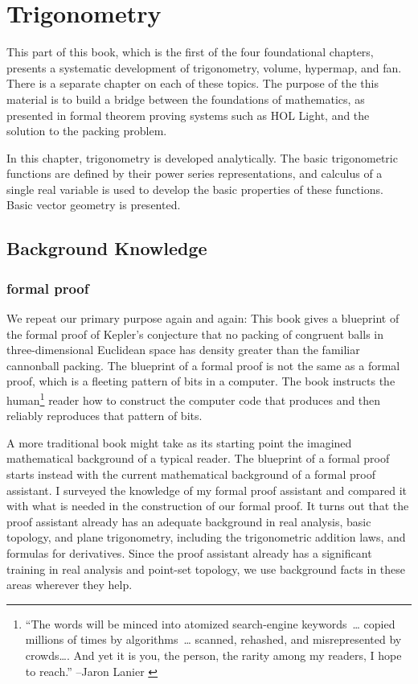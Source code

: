 \chapter{Trigonometry}
\label{part:trig}
%

\begin{summary}
  This part of this book, which is the first of the four foundational
  chapters, presents a systematic development of trigonometry, volume,
  hypermap, and fan.  There is a separate chapter on each of these
  topics.  The purpose of the this material is to build a bridge
  between the foundations of mathematics, as presented in formal
  theorem proving systems such as HOL Light, and the solution to the
  packing problem.  

  In this chapter, trigonometry is developed analytically.  The basic
  trigonometric functions are defined by their power series
  representations, and calculus of a single real variable is used to
  develop the basic properties of these functions.  Basic vector
  geometry is presented.
\end{summary}


\section{Background Knowledge}

\subsection{formal proof}

We repeat our primary purpose again and again: This book gives a
blueprint of the formal proof of Kepler's conjecture that no packing of
congruent balls in three-dimensional Euclidean space has density
greater than the familiar cannonball packing.  The blueprint of a
formal proof is not the same as a formal proof, which is a 
fleeting pattern of bits in a computer.  The book instructs the
human\footnote{``The words will be minced into atomized search-engine
  keywords~\dots{} copied millions of times by algorithms~\dots{}
  scanned, rehashed, and misrepresented by crowds\dots.  And yet
  it is you, the person, the rarity among my readers, I hope to
  reach.'' --Jaron Lanier \cite{Lanier}} reader how to construct the
computer code that  produces and then reliably reproduces that
pattern of bits.

A more traditional book might take as its starting point the imagined
mathematical background of a typical reader.  The blueprint of a
formal proof starts instead with the current mathematical background
of a formal proof assistant.  I surveyed the knowledge of my formal
proof assistant and compared it with what is needed in the
construction of our formal proof.  It turns out that the proof
assistant already has an adequate background in real analysis, basic
topology, and plane trigonometry, including the trigonometric addition
laws, and formulas for derivatives.  Since the proof assistant already
has a significant training in real analysis and point-set topology, we
 use background facts in these areas wherever they help.


